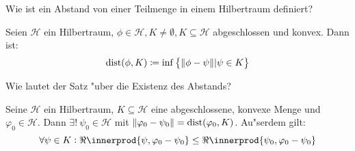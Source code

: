 \documentclass[9pt]{article}
\newcommand{\Hi}{\mathcal{H}}
\DeclarePairedDelimiter{\innerprod}\langle\rangle
\newenvironment{field}{}{\newpage}
\newif\ifnote
\newenvironment{note}{\notetrue}{\notefalse}
\newcommand{\localtag}{}
\newcommand{\globaltag}{}
\newcommand{\uuid}{}
\newcommand{\tags}[1]{
    \ifnote 
        \renewcommand{\localtag}{#1}
    \else
        \renewcommand{\globaltag}{#1}
    \fi 
    }
\newcommand{\xplain}[1]{\renewcommand{\uuid}{#1}}
\begin{document}
	\begin{note}
		\xplain{UUID}
		\tags{definition, satz, 5.2.9, 5.2.10}
		
		\begin{field}  %
			Wie ist ein Abstand von einer Teilmenge in einem Hilbertraum definiert?
		\end{field}
		
		\begin{field}  %
			Seien $\Hi$ ein Hilbertraum, $\phi \in \Hi, K \neq \emptyset, K \subseteq \Hi$ abgeschlossen und konvex. Dann ist:
			\begin{equation*}
				\text{dist}(\phi, K) \coloneqq \inf\qty{\norm{\phi - \psi} | \psi \in K}
			\end{equation*}
		\end{field}
	
		\begin{field}  %
			Wie lautet der Satz "uber die Existenz des Abstands?
		\end{field}
		
		\begin{field}  %
			Seine $\Hi$ ein Hilbertraum, $K\subseteq \Hi$ eine abgeschlossene, konvexe Menge und $\varphi_0 \in \Hi$. Dann $\exists! \ \psi_0 \in \Hi$ mit $\norm{\varphi_0 - \psi_0} = \text{dist}(\varphi_0, K)$. Au"serdem gilt:
			\begin{equation*}
				\forall \psi \in K: \real\innerprod{\psi, \varphi_0 - \psi_0} \leq \real\innerprod{\psi_0, \varphi_0 - \psi_0}
			\end{equation*} 
		\end{field}
	\end{note}	
\end{document}
